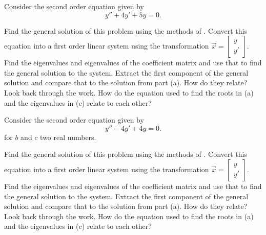 \documentclass{ximera}
\begin{document}
\begin{exercise}
    Consider the second order equation given by
    \begin{equation*}
        y'' + 4y' + 5y = 0.
    \end{equation*}
    \begin{tasks}
        \task Find the general solution of this problem using the methods of .
        \task Convert this equation into a first order linear system using the transformation $\vec{x} = \left[ \begin{smallmatrix} y \\ y' \end{smallmatrix} \right]$. 
        \task Find the eigenvalues and eigenvalues of the coefficient matrix and use that to find the general solution to the system.
        \task Extract the first component of the general solution and compare that to the solution from part (a). How do they relate?
        \task Look back through the work. How do the equation used to find the roots in (a) and the eigenvalues in (c) relate to each other?
    \end{tasks}
\end{exercise}

\begin{exercise}
    Consider the second order equation given by
    \begin{equation*}
        y'' - 4y' + 4y = 0.
    \end{equation*} for $b$ and $c$ two real numbers.
    \begin{tasks}
        \task Find the general solution of this problem using the methods of .
        \task Convert this equation into a first order linear system using the transformation $\vec{x} = \left[ \begin{smallmatrix} y \\ y' \end{smallmatrix} \right]$. 
        \task Find the eigenvalues and eigenvalues of the coefficient matrix and use that to find the general solution to the system.
        \task Extract the first component of the general solution and compare that to the solution from part (a). How do they relate?
        \task Look back through the work. How do the equation used to find the roots in (a) and the eigenvalues in (c) relate to each other?
    \end{tasks}
\end{exercise}
\end{document}
